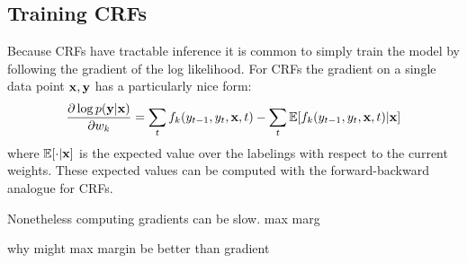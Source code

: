 \subsection{Training CRFs}

Because CRFs have tractable inference it is common to simply train the model by following the gradient of the log likelihood. For CRFs the gradient on a single data point $\mathbf{x}, \mathbf{y}$ has a particularly nice form:
\begin{align*}
\frac{\partial \log p(\mathbf{y}|\mathbf{x})}{\partial w_k} = \sum_{t} f_k(y_{t-1}, y_{t}, \mathbf{x}, t) - \sum_{t} \mathbb{E} [f_k(y_{t-1}, y_{t}, \mathbf{x}, t) | \mathbf{x}]
\end{align*}
where $\mathbb{E} [ \cdot | \mathbf{x}]$ is the expected value over the labelings with respect to the current weights. These expected values can be computed with the forward-backward analogue for CRFs.

Nonetheless computing gradients can be slow. 
max marg

why might max margin be better than gradient

%
